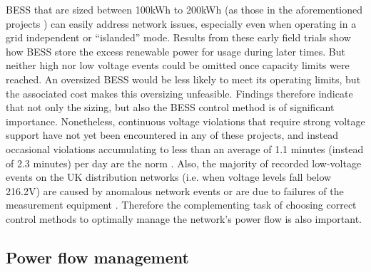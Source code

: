 BESS that are sized between 100kWh to 200kWh (as those in the aforementioned projects \cite{Wade2010, Wade2009, Overbeeke2010, GROWDERS2011}) can easily address network issues, especially even when operating in a grid independent or ``islanded'' mode.
Results from these early field trials show how BESS store the excess renewable power for usage during later times.
But neither high nor low voltage events could be omitted once capacity limits were reached.
An oversized BESS would be less likely to meet its operating limits, but the associated cost makes this oversizing unfeasible.
Findings therefore indicate that not only the sizing, but also the BESS control method is of significant importance.
Nonetheless, continuous voltage violations that require strong voltage support have not yet been encountered in any of these projects, and instead occasional violations accumulating to less than an average of 1.1 minutes (instead of 2.3 minutes) per day are the norm \cite{Sugihara2013}.
Also, the majority of recorded low-voltage events on the UK distribution networks (i.e. when voltage levels fall below 216.2V) are caused by anomalous network events or are due to failures of the measurement equipment \cite{UKPowerNetworks2014a}.
Therefore the complementing task of choosing correct control methods to optimally manage the network's power flow is also important.

\subsection{Power flow management}
\label{ch-literature:subsec:power-flow-management}

